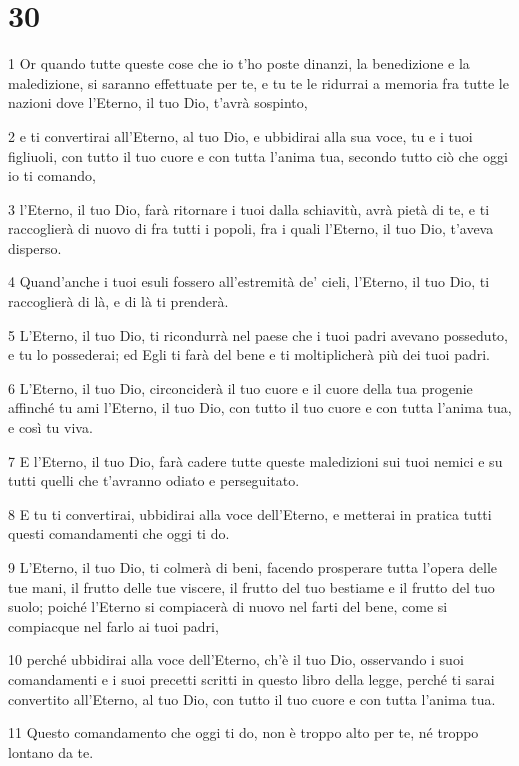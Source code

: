 \chapter{30}

\par 1 Or quando tutte queste cose che io t'ho poste dinanzi, la benedizione e la maledizione, si saranno effettuate per te, e tu te le ridurrai a memoria fra tutte le nazioni dove l'Eterno, il tuo Dio, t'avrà sospinto,
\par 2 e ti convertirai all'Eterno, al tuo Dio, e ubbidirai alla sua voce, tu e i tuoi figliuoli, con tutto il tuo cuore e con tutta l'anima tua, secondo tutto ciò che oggi io ti comando,
\par 3 l'Eterno, il tuo Dio, farà ritornare i tuoi dalla schiavitù, avrà pietà di te, e ti raccoglierà di nuovo di fra tutti i popoli, fra i quali l'Eterno, il tuo Dio, t'aveva disperso.
\par 4 Quand'anche i tuoi esuli fossero all'estremità de' cieli, l'Eterno, il tuo Dio, ti raccoglierà di là, e di là ti prenderà.
\par 5 L'Eterno, il tuo Dio, ti ricondurrà nel paese che i tuoi padri avevano posseduto, e tu lo possederai; ed Egli ti farà del bene e ti moltiplicherà più dei tuoi padri.
\par 6 L'Eterno, il tuo Dio, circonciderà il tuo cuore e il cuore della tua progenie affinché tu ami l'Eterno, il tuo Dio, con tutto il tuo cuore e con tutta l'anima tua, e così tu viva.
\par 7 E l'Eterno, il tuo Dio, farà cadere tutte queste maledizioni sui tuoi nemici e su tutti quelli che t'avranno odiato e perseguitato.
\par 8 E tu ti convertirai, ubbidirai alla voce dell'Eterno, e metterai in pratica tutti questi comandamenti che oggi ti do.
\par 9 L'Eterno, il tuo Dio, ti colmerà di beni, facendo prosperare tutta l'opera delle tue mani, il frutto delle tue viscere, il frutto del tuo bestiame e il frutto del tuo suolo; poiché l'Eterno si compiacerà di nuovo nel farti del bene, come si compiacque nel farlo ai tuoi padri,
\par 10 perché ubbidirai alla voce dell'Eterno, ch'è il tuo Dio, osservando i suoi comandamenti e i suoi precetti scritti in questo libro della legge, perché ti sarai convertito all'Eterno, al tuo Dio, con tutto il tuo cuore e con tutta l'anima tua.
\par 11 Questo comandamento che oggi ti do, non è troppo alto per te, né troppo lontano da te.

